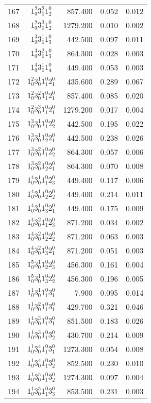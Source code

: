 \documentclass[12pt]{article}
\begin{document}
\begin{table}
\begin{tabular}{rcrrr}
167&$1_0^2 3_0^2 1_2^0$& 857.400& 0.052& 0.012\\
168&$1_0^2 3_0^3 1_2^0$& 1279.200& 0.010& 0.002\\
169&$1_0^3 3_0^1 1_3^0$& 442.500& 0.097& 0.011\\
170&$1_0^3 3_0^2 1_3^0$& 864.300& 0.028& 0.003\\
171&$1_0^4 3_0^1 1_4^0$& 449.400& 0.053& 0.003\\
172&$1_0^2 3_0^1 1_1^0 2_1^0$& 435.600& 0.289& 0.067\\
173&$1_0^2 3_0^2 1_1^0 2_1^0$& 857.400& 0.085& 0.020\\
174&$1_0^2 3_0^3 1_1^0 2_1^0$& 1279.200& 0.017& 0.004\\
175&$1_0^3 3_0^1 1_1^0 2_2^0$& 442.500& 0.195& 0.022\\
176&$1_0^3 3_0^1 1_2^0 2_1^0$& 442.500& 0.238& 0.026\\
177&$1_0^3 3_0^2 1_1^0 2_2^0$& 864.300& 0.057& 0.006\\
178&$1_0^3 3_0^2 1_2^0 2_1^0$& 864.300& 0.070& 0.008\\
179&$1_0^4 3_0^1 1_1^0 2_3^0$& 449.400& 0.117& 0.006\\
180&$1_0^4 3_0^1 1_2^0 2_2^0$& 449.400& 0.214& 0.011\\
181&$1_0^4 3_0^1 1_3^0 2_1^0$& 449.400& 0.175& 0.009\\
182&$1_0^4 3_0^2 1_1^0 2_3^0$& 871.200& 0.034& 0.002\\
183&$1_0^4 3_0^2 1_2^0 2_2^0$& 871.200& 0.063& 0.003\\
184&$1_0^4 3_0^2 1_3^0 2_1^0$& 871.200& 0.051& 0.003\\
185&$1_0^5 3_0^1 1_2^0 2_3^0$& 456.300& 0.161& 0.004\\
186&$1_0^5 3_0^1 1_3^0 2_2^0$& 456.300& 0.196& 0.005\\
187&$1_0^1 3_0^1 1_1^0 3_1^0$& 7.900& 0.095& 0.014\\
188&$1_0^1 3_0^2 1_1^0 3_1^0$& 429.700& 0.321& 0.046\\
189&$1_0^1 3_0^3 1_1^0 3_1^0$& 851.500& 0.183& 0.026\\
190&$1_0^1 3_0^3 1_1^0 3_2^0$& 430.700& 0.214& 0.009\\
191&$1_0^1 3_0^4 1_1^0 3_1^0$& 1273.300& 0.054& 0.008\\
192&$1_0^1 3_0^4 1_1^0 3_2^0$& 852.500& 0.230& 0.010\\
193&$1_0^1 3_0^5 1_1^0 3_2^0$& 1274.300& 0.097& 0.004\\
194&$1_0^1 3_0^5 1_1^0 3_3^0$& 853.500& 0.231& 0.003\\

\end{tabular}
\end{table}
\end{document}

